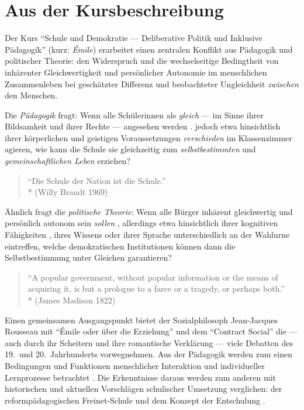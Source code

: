 \section[Kursbeschreibung]{Aus der Kursbeschreibung}

Der Kurs ``Schule und Demokratie --- Deliberative Politik und Inklusive Pädagogik'' (kurz: \emph{Émile}) erarbeitet einen zentralen Konflikt aus Pädagogik und politischer Theorie:
den Widerspruch und die wechselseitige Bedingtheit von inhärenter Gleichwertigkeit und persönlicher Autonomie im menschlichen Zusammenleben bei geschätzter Differenz und beobachteter Ungleichheit \emph{zwischen} den Menschen.

Die \emph{Pädagogik} fragt: 
Wenn alle Schülerinnen als \emph{gleich} --- im Sinne ihrer Bildsamkeit und ihrer Rechte --- angesehen werden \parencites[vgl.][]{UN-2008,benner-2012}.
jedoch etwa hinsichtlich ihrer körperlichen und geistigen Voraussetzungen \emph{verschieden} im Klassenzimmer agieren, wie kann die Schule sie gleichzeitig zum \emph{selbstbestimmten} und \emph{gemeinschaftlichen Leben} erziehen?

\begin{quote}
    ``Die Schule der Nation ist die Schule.''\\*
    (Willy Brandt 1969)
\end{quote}

Ähnlich fragt die \emph{politische Theorie}:
Wenn alle Bürger inhärent gleichwertig und persönlich autonom sein \emph{sollen} \parencite[etwa][]{Dahl-1989-aa}, allerdings etwa hinsichtlich ihrer kognitiven Fähigkeiten \parencite{Rosenberg-2002-aa}, ihres Wissens \parencite[etwa][]{Converse-1970-aa} oder ihrer Sprache unterschiedlich an der Wahlurne eintreffen, welche demokratischen Institutionen können dann die Selbstbestimmung unter Gleichen garantieren?

\begin{quote}
    ``A popular government, without popular information or the means of acquiring it, is but a prologue to a farce or a tragedy, or perhaps both.''\\*
    (James Madison 1822)
\end{quote}

Einen gemeinsamen Ausgangspunkt bietet der Sozialphilosoph Jean-Jacques Rousseau mit ``Émile oder über die Erziehung'' \parencite*{rousseau-1762} und dem ``Contract Social'' \parencite*{Rousseau-1762-b} die --- auch durch ihr Scheitern und ihre romantische Verklärung --- viele Debatten des 19.\ und 20.\ Jahrhunderts vorwegnehmen.
Aus der Pädagogik werden zum einen Bedingungen und Funktionen menschlicher Interaktion und individueller Lernprozesse betrachtet \parencites{siebert-2003,benner-2012,mead-1934en}.
Die Erkenntnisse daraus werden zum anderen mit historischen und aktuellen Vorschlägen schulischer Umsetzung verglichen: der reformpädagogischen Freinet-Schule und dem Konzept der Entschulung \parencites{Freinet1979,Illich-1971}.

